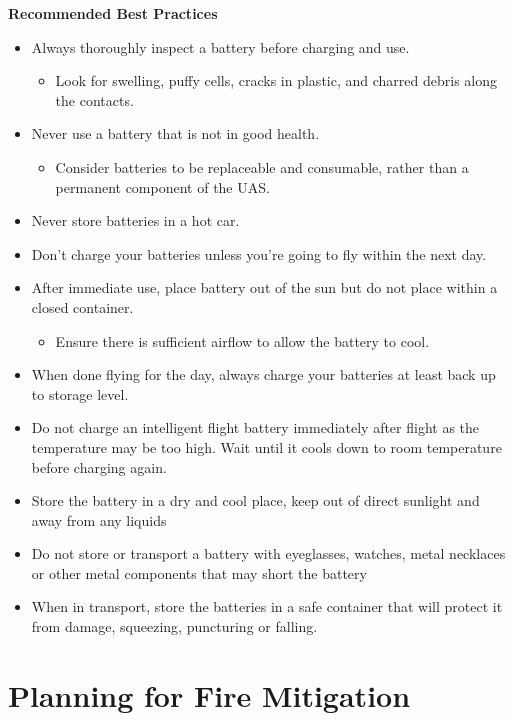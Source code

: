 \documentclass[
]{book}
\providecommand{\tightlist}{%
  \setlength{\itemsep}{0pt}\setlength{\parskip}{0pt}}
\begin{document}
\textbf{Recommended Best Practices}

\begin{itemize}
\item
  Always thoroughly inspect a battery before charging and use.

  \begin{itemize}
  \tightlist
  \item
    Look for swelling, puffy cells, cracks in plastic, and charred debris along the contacts.
  \end{itemize}
\item
  Never use a battery that is not in good health.

  \begin{itemize}
  \tightlist
  \item
    Consider batteries to be replaceable and consumable, rather than a permanent component of the UAS.
  \end{itemize}
\item
  Never store batteries in a hot car.
\item
  Don't charge your batteries unless you're going to fly within the next day.
\item
  After immediate use, place battery out of the sun but do not place within a closed container.

  \begin{itemize}
  \tightlist
  \item
    Ensure there is sufficient airflow to allow the battery to cool.
  \end{itemize}
\item
  When done flying for the day, always charge your batteries at least back up to storage level.
\item
  Do not charge an intelligent flight battery immediately after flight as the temperature may be too high. Wait until it cools down to room temperature before charging again.
\item
  Store the battery in a dry and cool place, keep out of direct sunlight and away from any liquids
\item
  Do not store or transport a battery with eyeglasses, watches, metal necklaces or other metal components that may short the battery
\item
  When in transport, store the batteries in a safe container that will protect it from damage, squeezing, puncturing or falling.
\end{itemize}

\hypertarget{planning-for-fire-mitigation}{%
\section{Planning for Fire Mitigation}\label{planning-for-fire-mitigation}}
\end{document}
